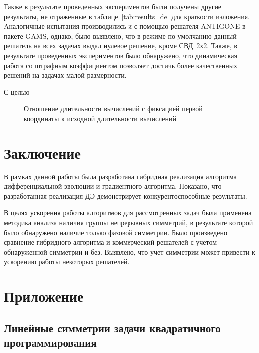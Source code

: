 \documentclass{llncs}
\begin{document}
Также в результате проведенных экспериментов были получены другие результаты, не отраженные в таблице~\ref{tab:results_de} для краткости изложения. Aналогичные испытания производились и с помощью решателя ANTIGONE в пакете GAMS, однако, было выявлено, что в режиме по умолчанию данный решатель на всех задачах выдал нулевое решение, кроме СВД~2х2. Также, в результате проведенных экспериментов было обнаружено, что динамическая работа со штрафным коэффициентом позволяет достичь более качественных решений на задачах малой размерности.

С целью 

\begin{figure}
\caption{Отношение длительности вычислений с фиксацией первой координаты к исходной длительности вычислений}
\label{ris:ring}
\end{figure}


\section{Заключение}\label{sec:conclusion}

В рамках данной работы была разработана гибридная реализация алгоритма дифференциальной эволюции и градиентного алгоритма. Показано, что разработанная реализация ДЭ демонстрирует конкурентоспособные результаты.

В целях ускорения работы алгоритмов для рассмотренных задач была применена методика анализа наличия группы непрерывных симметрий, в результате которой было обнаружено наличие только фазовой симметрии. Было произведено сравнение гибридного алгоритма и коммерческий решателей с учетом обнаруженной симметрии и без. Выявлено, что учет симметрии может привести к ускорению работы некоторых решателей.


\section*{Приложение}\label{sec:sym}
\subsection*{Линейные симметрии задачи квадратичного программирования}\label{sec:sym:mod}
\end{document}
